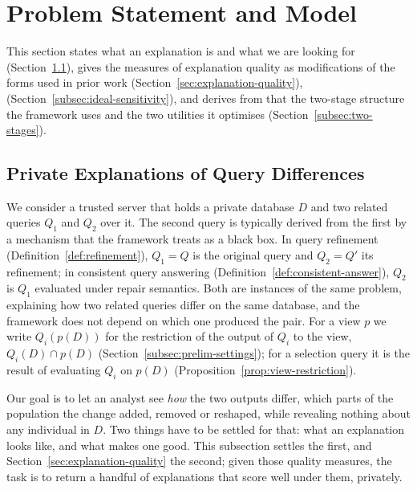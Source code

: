 
\section{Problem Statement and Model}\label{sec:model}

This section states what an explanation is and what we are looking for (Section~\ref{subsec:private-query-difference-setting}), gives the measures of explanation quality as modifications of the forms used in prior work (Section~\ref{sec:explanation-quality}),  (Section~\ref{subsec:ideal-sensitivity}), and derives from that the two-stage structure the framework uses and the two utilities it optimises (Section~\ref{subsec:two-stages}).

\subsection{Private Explanations of Query Differences}
\label{subsec:private-query-difference-setting}

We consider a trusted server that holds a private database $D$ and two related queries $Q_1$ and $Q_2$ over it.
The second query is typically derived from the first by a mechanism that the framework treats as a black box.
In query refinement (Definition~\ref{def:refinement}), $Q_1=Q$ is the original query and $Q_2=Q'$ its refinement; in consistent query answering (Definition~\ref{def:consistent-answer}), $Q_2$ is $Q_1$ evaluated under repair semantics.
Both are instances of the same problem, explaining how two related queries differ on the same database, and the framework does not depend on which one produced the pair.
For a view $p$ we write $Q_i(p(D))$ for the restriction of the output of $Q_i$ to the view, $Q_i(D)\cap p(D)$ (Section~\ref{subsec:prelim-settings}); for a selection query it is the result of evaluating $Q_i$ on $p(D)$ (Proposition~\ref{prop:view-restriction}).

Our goal is to let an analyst see \emph{how} the two outputs differ, which parts of the population the change added, removed or reshaped, while revealing nothing about any individual in $D$.
Two things have to be settled for that: what an explanation looks like, and what makes one good.
This subsection settles the first, and Section~\ref{sec:explanation-quality} the second; given those quality measures, the task is to return a handful of explanations that score well under them, privately.

